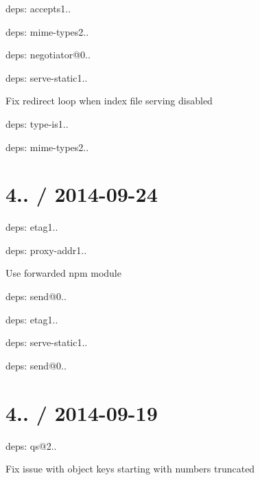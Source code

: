 \begin{DoxyItemize}
\item deps\+: accepts1..
\begin{DoxyItemize}
\item deps\+: mime-\/types2..
\item deps\+: negotiator@0..
\end{DoxyItemize}
\item deps\+: serve-\/static1..
\begin{DoxyItemize}
\item Fix redirect loop when index file serving disabled
\end{DoxyItemize}
\item deps\+: type-\/is1..
\begin{DoxyItemize}
\item deps\+: mime-\/types2..
\end{DoxyItemize}
\end{DoxyItemize}

\section*{4.. / 2014-\/09-\/24 }


\begin{DoxyItemize}
\item deps\+: etag1..
\item deps\+: proxy-\/addr1..
\begin{DoxyItemize}
\item Use {\ttfamily forwarded} npm module
\end{DoxyItemize}
\item deps\+: send@0..
\begin{DoxyItemize}
\item deps\+: etag1..
\end{DoxyItemize}
\item deps\+: serve-\/static1..
\begin{DoxyItemize}
\item deps\+: send@0..
\end{DoxyItemize}
\end{DoxyItemize}

\section*{4.. / 2014-\/09-\/19 }


\begin{DoxyItemize}
\item deps\+: qs@2..
\begin{DoxyItemize}
\item Fix issue with object keys starting with numbers truncated
\end{DoxyItemize}
\end{DoxyItemize}

